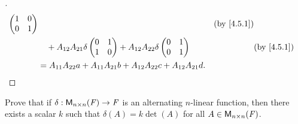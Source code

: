\begin{proof}[]
\begin{align*}
\begin{pmatrix}
			                                                                                      1 & 0 \\
			                                                                                      0 & 1
		                                                                                      \end{pmatrix}                            &  & \by{4.5.1}       \\
		                      & \quad + A_{1 2} A_{2 1} \delta\begin{pmatrix}
			                                                      0 & 1 \\
			                                                      1 & 0
		                                                      \end{pmatrix} + A_{1 2} A_{2 2} \delta\begin{pmatrix}
			                                                                                            0 & 1 \\
			                                                                                            0 & 1
		                                                                                            \end{pmatrix}                            &  & \by{4.5.1} \\
		                      & = A_{1 1} A_{2 2} a + A_{1 1} A_{2 1} b + A_{1 2} A_{2 2} c + A_{1 2} A_{2 1} d.
	\end{align*}
\end{proof}

\begin{ex}\label{ex:4.5.16}
	Prove that if \(\delta : \mathsf{M}_{{n} \times n}({\mathit{F}}) \to \mathit{F}\) is an alternating \(n\)-linear function, then there exists a scalar \(k\) such that \(\delta(A) = k \det(A)\) for all \(A \in \mathsf{M}_{{n} \times n}({\mathit{F}})\).
\end{ex}

